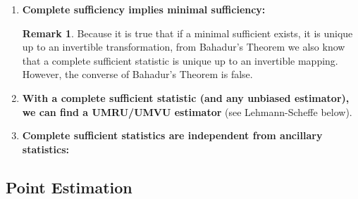 \documentclass{article}
\theoremstyle{definition}
\newtheorem{theorem}{Theorem}
\theoremstyle{definition}
\theoremstyle{definition}
\theoremstyle{definition}
\theoremstyle{definition}
\newtheorem*{remark}{Remark}
\theoremstyle{definition}
\theoremstyle{definition}
\begin{document}
\begin{enumerate}[(1)]

\item \textbf{Complete sufficiency implies minimal sufficiency:}

\noindent{}

\begin{remark}Because it is true that if a minimal sufficient exists, it is unique up to an invertible transformation, from Bahadur's Theorem we also know that a complete sufficient statistic is unique up to an invertible mapping. However, the converse of Bahadur's Theorem is false.

\end{remark}

\item \textbf{With a complete sufficient statistic (and any unbiased estimator), we can find a UMRU/UMVU estimator} (see Lehmann-Scheffe below).

\item \textbf{Complete sufficient statistics are independent from ancillary statistics:}

\noindent{}



\end{enumerate}

\subsection{Point Estimation}
\end{document}
